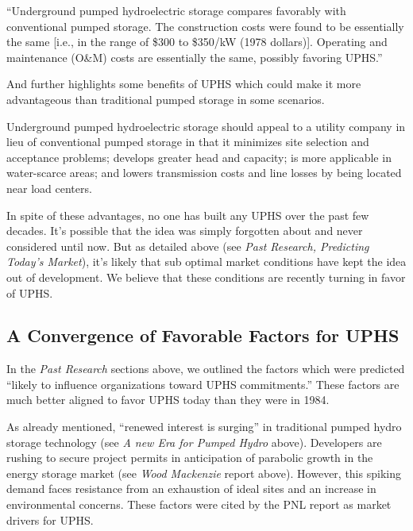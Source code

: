 \documentclass[hidelinks,12pt,a4paper]{article}
\begin{document}
\begin{displayquote}
“Underground pumped hydroelectric storage compares favorably with conventional pumped storage. The construction costs were found to be essentially the same [i.e., in the range of \$300 to \$350/kW (1978 dollars)]. Operating and maintenance (O\&M) costs are essentially the same, possibly favoring UPHS.” \cite{UndergroundPumpedHydroelectricStorage}
\end{displayquote}

And further highlights some benefits of UPHS which could make it more advantageous than traditional pumped storage in some scenarios.

\begin{displayquote}
Underground pumped hydroelectric storage should appeal to a utility company in lieu of conventional pumped storage in that it minimizes site selection and acceptance problems; develops greater head and capacity; is more applicable in water-scarce areas; and lowers transmission costs and line losses by being located near load centers. \cite{UndergroundPumpedHydroelectricStorage}
\end{displayquote}


In spite of these advantages, no one has built any UPHS over the past few decades. It's possible that the idea was simply forgotten about and never considered until now. But as detailed above (see \textit{Past Research, Predicting Today's Market}), it's likely that sub optimal market conditions have kept the idea out of development. We believe that these conditions are recently turning in favor of UPHS.

\subsection{A Convergence of Favorable Factors for UPHS}
In the \textit{Past Research} sections above, we outlined the factors which were predicted “likely to influence organizations toward UPHS commitments.” These factors are much better aligned to favor UPHS today than they were in 1984.

As already mentioned, “renewed interest is surging” in traditional pumped hydro storage technology (see \textit{A new Era for Pumped Hydro} above). Developers are rushing to secure project permits in anticipation of parabolic growth in the energy storage market (see \textit{Wood Mackenzie} report above). However, this spiking demand faces resistance from an exhaustion of ideal sites and an increase in environmental concerns. These factors were cited by the PNL report as market drivers for UPHS.
\end{document}
